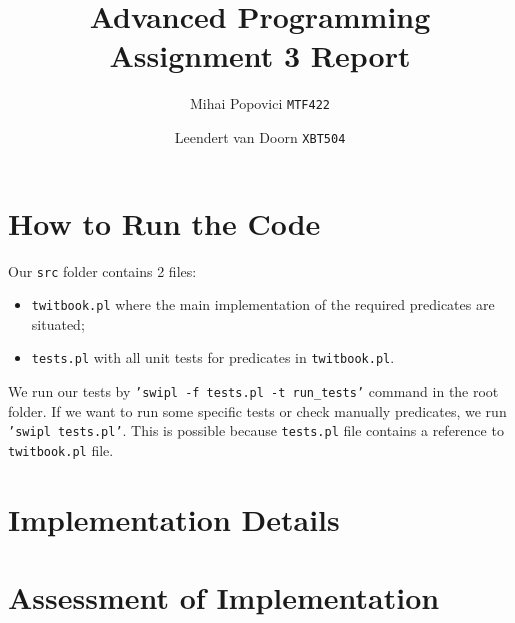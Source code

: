 \documentclass{article}
\title{Advanced Programming Assignment 3 Report}
\author{Mihai Popovici \texttt{MTF422} \and Leendert van Doorn \texttt{XBT504}}
\begin{document}
\maketitle

\section{How to Run the Code}
Our \texttt{src} folder contains 2 files:
\begin{itemize}
	\item \texttt{twitbook.pl} where the main implementation of the required predicates are situated;
	\item \texttt{tests.pl} with all unit tests for predicates in \texttt{twitbook.pl}.  
\end{itemize} 
We run our tests by \texttt{'swipl -f tests.pl -t run\_tests'} command in the root folder.
If we want to run some specific tests or check manually predicates, we run \texttt{'swipl tests.pl'}. This is possible because \texttt{tests.pl} file contains a reference to \texttt{twitbook.pl} file.

\section{Implementation Details}


\section{Assessment of Implementation}
\end{document}
